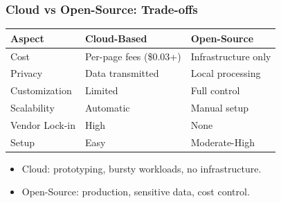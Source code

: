 \begin{frame}[fragile]\frametitle{Cloud vs Open-Source: Trade-offs}
\begin{table}[h]
\centering
\tiny
\begin{tabular}{|l|l|l|}
\hline
\textbf{Aspect} & \textbf{Cloud-Based} & \textbf{Open-Source} \\
\hline
Cost & Per-page fees (\$0.03+) & Infrastructure only \\
Privacy & Data transmitted & Local processing \\
Customization & Limited & Full control \\
Scalability & Automatic & Manual setup \\
Vendor Lock-in & High & None \\
Setup & Easy & Moderate-High \\
\hline
\end{tabular}
\end{table}
      \begin{itemize}
        \item Cloud: prototyping, bursty workloads, no infrastructure.
        \item Open-Source: production, sensitive data, cost control.
      \end{itemize}
\end{frame}

